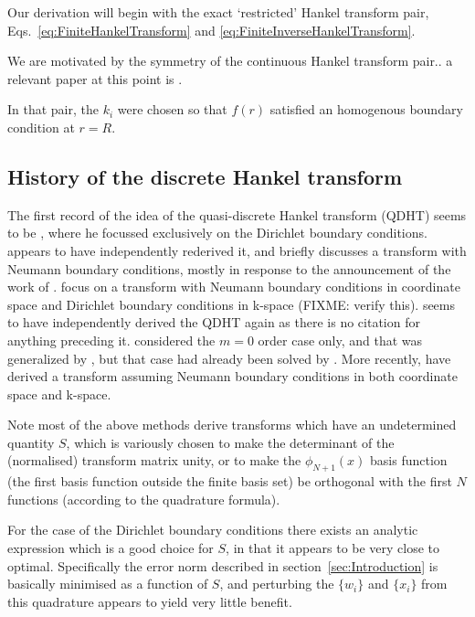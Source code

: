 \documentclass[aip,amsmath,amssymb,reprint,twocolumn]{revtex4-1}
\begin{document}
Our derivation will begin with the exact `restricted' Hankel transform pair, Eqs.~\eqref{eq:FiniteHankelTransform} and \eqref{eq:FiniteInverseHankelTransform}.  



We are motivated by the symmetry of the continuous Hankel transform pair.. a relevant paper at this point is \citet{Rawn:1989}.

In that pair, the $k_i$ were chosen so that $f(r)$ satisfied an homogenous boundary condition at $r=R$.

\subsection{History of the discrete Hankel transform}

The first record of the idea of the quasi-discrete Hankel transform (QDHT) seems to be \citet{Johnson:1987}, where he focussed exclusively on the Dirichlet boundary conditions.  \citet{Lemoine:1994} appears to have independently rederived it, and briefly discusses a transform with Neumann boundary conditions, mostly in response to the announcement of the work of \citet{Stade:1995}.  \citet{Stade:1995} focus on a transform with Neumann boundary conditions in coordinate space and Dirichlet boundary conditions in k-space (FIXME: verify this).  \citet{Yu:1998} seems to have independently derived the QDHT again as there is no citation for anything preceding it.  \citet{Yu:1998} considered the $m=0$ order case only, and that was generalized by \citet{Guizar-Sicairos:2004}, but that case had already been solved by \citet{Johnson:1987,Lemoine:1994}.  More recently, \citet{Kai-Ming:2009} have derived a transform assuming Neumann boundary conditions in both coordinate space and k-space.

Note most of the above methods derive transforms which have an undetermined quantity $S$, which is variously chosen to make the determinant of the (normalised) transform matrix unity, or to make the $\phi_{N+1}(x)$ basis function (the first basis function outside the finite basis set) be orthogonal with the first $N$ functions (according to the quadrature formula).

For the case of the Dirichlet boundary conditions there exists an analytic expression which is a good choice for $S$, in that it appears to be very close to optimal. Specifically the error norm described in section~\ref{sec:Introduction} is basically minimised as a function of $S$, and perturbing the $\{w_i\}$ and $\{x_i\}$ from this quadrature appears to yield very little benefit.
\end{document}
